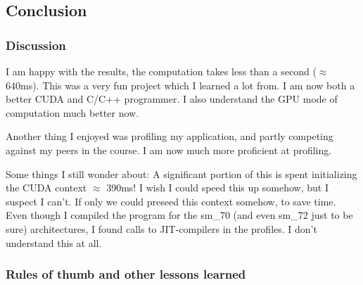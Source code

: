 \documentclass[a4paper,titlepage,12pt]{article}
\begin{document}
\begin{description}[left = \parindent]
\part{Conclusion}

\section{Discussion}

I am happy with the results, the computation takes less than a second (\(\approx\) 640ms).
This was a very fun project which I learned a lot from.
I am now both a better CUDA and C/C++ programmer.
I also understand the GPU mode of computation much better now.

Another thing I enjoyed was profiling my application, and partly competing against my peers in the course.
I am now much more proficient at profiling.

Some things I still wonder about:
A significant portion of this is spent initializing the CUDA context \(\approx\) 390ms!
I wish I could speed this up somehow, but I suspect I can't.
If only we could preseed this context somehow, to save time.
Even though I compiled the program for the sm\_70 (and even sm\_72 just to be sure) architectures, I found calls to JIT-compilers in the profiles.
I don't understand this at all.


\section{Rules of thumb and other lessons learned}


\end{description}
\end{document}
